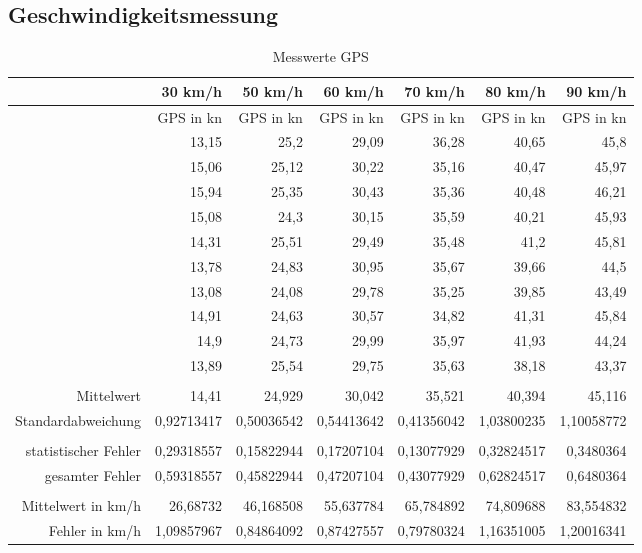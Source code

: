 \subsection{Geschwindigkeitsmessung}
\begin{table}[htbp]
  \centering
  \caption{Messwerte GPS}
    \begin{tabular}{rrrrrrr}
    \toprule
          & 30 km/h & 50 km/h & 60 km/h & 70 km/h & 80 km/h & 90 km/h \\
    \midrule
          & GPS in kn & GPS in kn & GPS in kn & GPS in kn & GPS in kn & GPS in kn \\
          & 13,15 & 25,2  & 29,09 & 36,28 & 40,65 & 45,8 \\
          & 15,06 & 25,12 & 30,22 & 35,16 & 40,47 & 45,97 \\
          & 15,94 & 25,35 & 30,43 & 35,36 & 40,48 & 46,21 \\
          & 15,08 & 24,3  & 30,15 & 35,59 & 40,21 & 45,93 \\
          & 14,31 & 25,51 & 29,49 & 35,48 & 41,2  & 45,81 \\
          & 13,78 & 24,83 & 30,95 & 35,67 & 39,66 & 44,5 \\
          & 13,08 & 24,08 & 29,78 & 35,25 & 39,85 & 43,49 \\
          & 14,91 & 24,63 & 30,57 & 34,82 & 41,31 & 45,84 \\
          & 14,9  & 24,73 & 29,99 & 35,97 & 41,93 & 44,24 \\
          & 13,89 & 25,54 & 29,75 & 35,63 & 38,18 & 43,37 \\
          &       &       &       &       &       &  \\
    Mittelwert & 14,41 & 24,929 & 30,042 & 35,521 & 40,394 & 45,116 \\
    Standardabweichung & 0,92713417 & 0,50036542 & 0,54413642 & 0,41356042 & 1,03800235 & 1,10058772 \\
          &       &       &       &       &       &  \\
    statistischer Fehler & 0,29318557 & 0,15822944 & 0,17207104 & 0,13077929 & 0,32824517 & 0,3480364 \\
    gesamter Fehler & 0,59318557 & 0,45822944 & 0,47207104 & 0,43077929 & 0,62824517 & 0,6480364 \\
          &       &       &       &       &       &  \\
    Mittelwert in km/h & 26,68732 & 46,168508 & 55,637784 & 65,784892 & 74,809688 & 83,554832 \\
    Fehler in km/h & 1,09857967 & 0,84864092 & 0,87427557 & 0,79780324 & 1,16351005 & 1,20016341 \\
    \bottomrule
    \end{tabular}%
  \label{tab:GPS}%
\end{table}%

